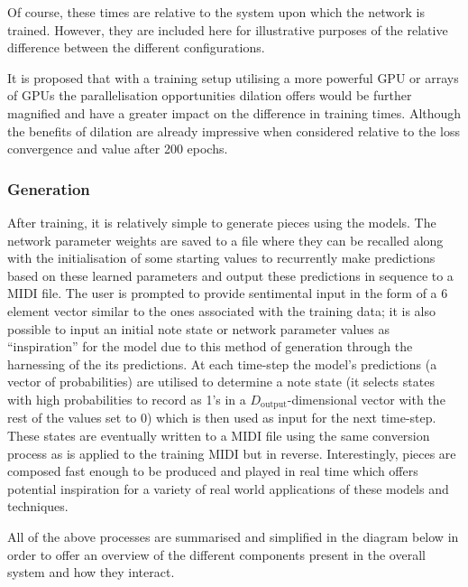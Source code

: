 \documentclass[12pt,]{article}
\begin{document}
Of course, these times are relative to the system upon which the network
is trained. However, they are included here for illustrative purposes of
the relative difference between the different configurations.

It is proposed that with a training setup utilising a more powerful GPU
or arrays of GPUs the parallelisation opportunities dilation offers
would be further magnified and have a greater impact on the difference
in training times. Although the benefits of dilation are already
impressive when considered relative to the loss convergence and value
after 200 epochs.

\hypertarget{generation}{%
\subsubsection{Generation}\label{generation}}

After training, it is relatively simple to generate pieces using the
models. The network parameter weights are saved to a file where they can
be recalled along with the initialisation of some starting values to
recurrently make predictions based on these learned parameters and
output these predictions in sequence to a MIDI file. The user is
prompted to provide sentimental input in the form of a 6 element vector
similar to the ones associated with the training data; it is also
possible to input an initial note state or network parameter values as
``inspiration'' for the model due to this method of generation through
the harnessing of the its predictions. At each time-step the model's
predictions (a vector of probabilities) are utilised to determine a note
state (it selects states with high probabilities to record as 1's in a
\(D_{\text{output}}\)-dimensional vector with the rest of the values set
to 0) which is then used as input for the next time-step. These states
are eventually written to a MIDI file using the same conversion process
as is applied to the training MIDI but in reverse. Interestingly, pieces
are composed fast enough to be produced and played in real time which
offers potential inspiration for a variety of real world applications of
these models and techniques.

All of the above processes are summarised and simplified in the diagram
below in order to offer an overview of the different components present
in the overall system and how they interact.
\end{document}
